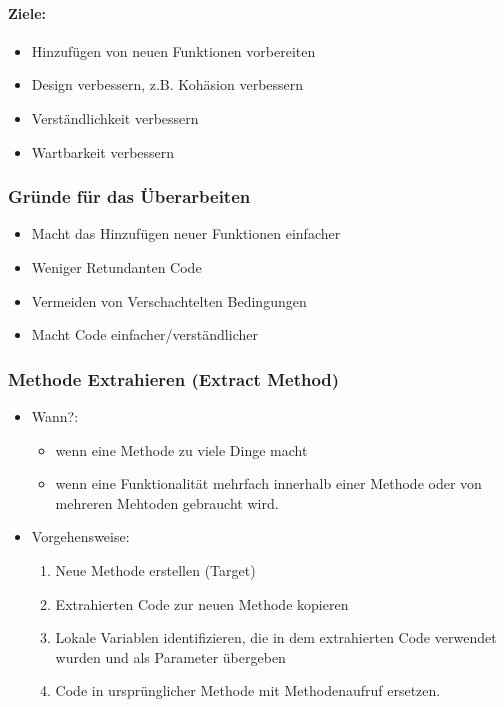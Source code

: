 \documentclass[ngerman,color=3b]{tuda_summary}
\begin{document}
\paragraph{Ziele:}\begin{itemize}
    \item Hinzufügen von neuen Funktionen vorbereiten
    \item Design verbessern, z.B. Kohäsion verbessern
    \item Verständlichkeit verbessern
    \item Wartbarkeit verbessern
\end{itemize}
\subsubsection{Gründe für das Überarbeiten}
\begin{itemize}
    \item Macht das Hinzufügen neuer Funktionen einfacher
    \item Weniger Retundanten Code
    \item Vermeiden von Verschachtelten Bedingungen
    \item Macht Code einfacher/verständlicher
\end{itemize}
\subsubsection{Methode Extrahieren (Extract Method)}
\begin{itemize}
    \item Wann?: \begin{itemize}
              \item wenn eine Methode zu viele Dinge macht
              \item wenn eine Funktionalität mehrfach innerhalb einer Methode oder von mehreren Mehtoden gebraucht wird.
          \end{itemize}
    \item Vorgehensweise:\begin{enumerate}
              \item Neue Methode erstellen (Target)
              \item Extrahierten Code zur neuen Methode kopieren
              \item Lokale Variablen identifizieren, die in dem extrahierten Code verwendet wurden und als Parameter übergeben
              \item Code in ursprünglicher Methode mit Methodenaufruf ersetzen.
          \end{enumerate}
\end{itemize}
\clearpage
\end{document}
